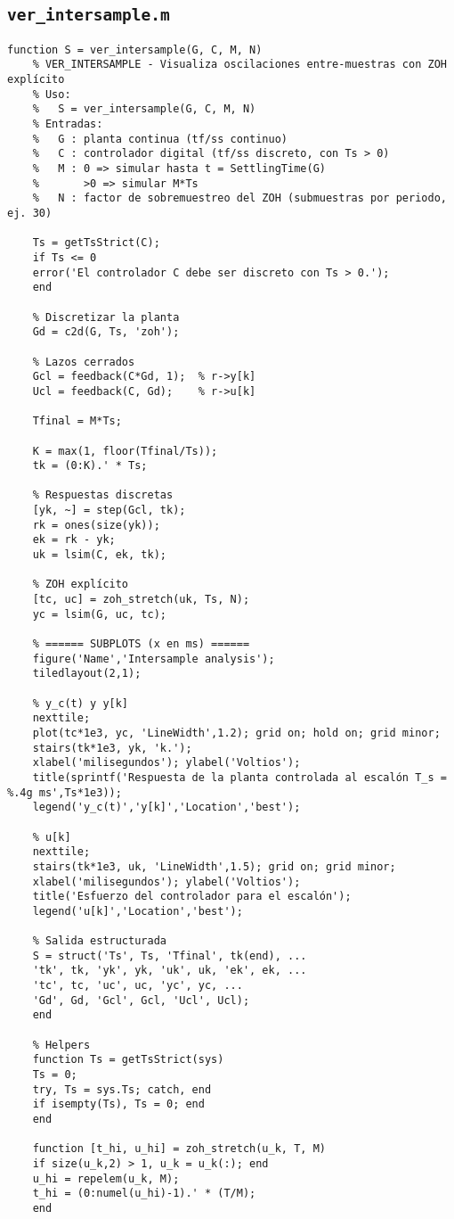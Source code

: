 \subsection{\texttt{ver\_intersample.m}}
\begin{lstlisting}[style=matlabstyle,caption={Visualización del comportamiento inter-muestra.}]
	function S = ver_intersample(G, C, M, N)
	% VER_INTERSAMPLE - Visualiza oscilaciones entre-muestras con ZOH explícito
	% Uso:
	%   S = ver_intersample(G, C, M, N)
	% Entradas:
	%   G : planta continua (tf/ss continuo)
	%   C : controlador digital (tf/ss discreto, con Ts > 0)
	%   M : 0 => simular hasta t = SettlingTime(G)
	%       >0 => simular M*Ts
	%   N : factor de sobremuestreo del ZOH (submuestras por periodo, ej. 30)
	
	Ts = getTsStrict(C);
	if Ts <= 0
	error('El controlador C debe ser discreto con Ts > 0.');
	end
	
	% Discretizar la planta
	Gd = c2d(G, Ts, 'zoh');
	
	% Lazos cerrados
	Gcl = feedback(C*Gd, 1);  % r->y[k]
	Ucl = feedback(C, Gd);    % r->u[k]
	
	Tfinal = M*Ts;
	
	K = max(1, floor(Tfinal/Ts));
	tk = (0:K).' * Ts;
	
	% Respuestas discretas
	[yk, ~] = step(Gcl, tk);
	rk = ones(size(yk));
	ek = rk - yk;
	uk = lsim(C, ek, tk);
	
	% ZOH explícito
	[tc, uc] = zoh_stretch(uk, Ts, N);
	yc = lsim(G, uc, tc);
	
	% ====== SUBPLOTS (x en ms) ======
	figure('Name','Intersample analysis');
	tiledlayout(2,1);
	
	% y_c(t) y y[k]
	nexttile;
	plot(tc*1e3, yc, 'LineWidth',1.2); grid on; hold on; grid minor;
	stairs(tk*1e3, yk, 'k.');
	xlabel('milisegundos'); ylabel('Voltios');
	title(sprintf('Respuesta de la planta controlada al escalón T_s = %.4g ms',Ts*1e3));
	legend('y_c(t)','y[k]','Location','best');
	
	% u[k]
	nexttile;
	stairs(tk*1e3, uk, 'LineWidth',1.5); grid on; grid minor;
	xlabel('milisegundos'); ylabel('Voltios');
	title('Esfuerzo del controlador para el escalón');
	legend('u[k]','Location','best');
	
	% Salida estructurada
	S = struct('Ts', Ts, 'Tfinal', tk(end), ...
	'tk', tk, 'yk', yk, 'uk', uk, 'ek', ek, ...
	'tc', tc, 'uc', uc, 'yc', yc, ...
	'Gd', Gd, 'Gcl', Gcl, 'Ucl', Ucl);
	end
	
	% Helpers
	function Ts = getTsStrict(sys)
	Ts = 0;
	try, Ts = sys.Ts; catch, end
	if isempty(Ts), Ts = 0; end
	end
	
	function [t_hi, u_hi] = zoh_stretch(u_k, T, M)
	if size(u_k,2) > 1, u_k = u_k(:); end
	u_hi = repelem(u_k, M);
	t_hi = (0:numel(u_hi)-1).' * (T/M);
	end
\end{lstlisting}

